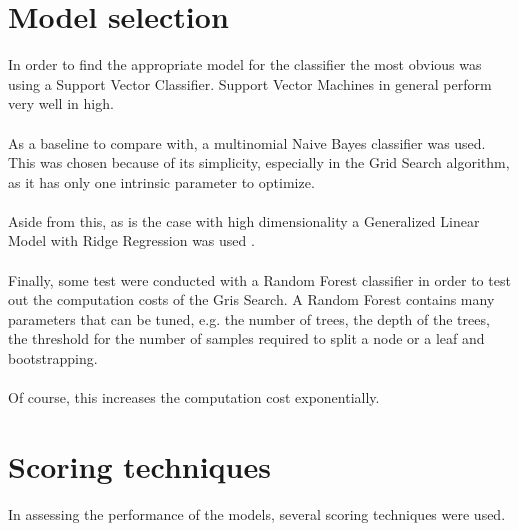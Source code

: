 \documentclass[12pt,a4paper]{report}
\begin{document}
\section{Model selection} In order to find the appropriate model for the classifier the most obvious was using a Support Vector Classifier. Support Vector Machines in general perform very well in high.

\paragraph{} As a baseline to compare with, a multinomial Naive Bayes classifier was used. This was chosen because of its simplicity, especially in the Grid Search algorithm, as it has only one intrinsic parameter to optimize.

\paragraph{} Aside from this, as is the case with high dimensionality a Generalized Linear Model with Ridge Regression was used \cite{scikit-learn1}. 

\paragraph{} Finally, some test were conducted with a Random Forest classifier in order to test out the computation costs of the Gris Search. A Random Forest contains many parameters that can be tuned, e.g. the number of trees, the depth of the trees, the threshold for the number of samples required to split a node or a leaf and bootstrapping.

\paragraph{} Of course, this increases the computation cost exponentially.

\section{Scoring techniques} In assessing the performance of the models, several scoring techniques were used.
\end{document}
